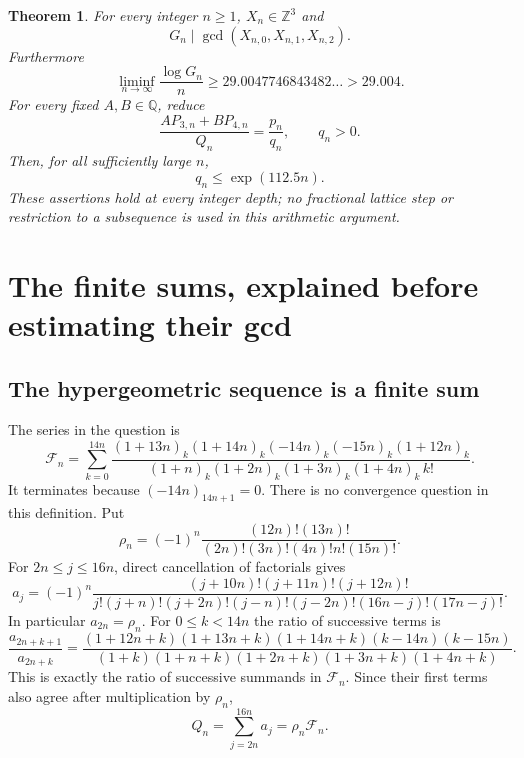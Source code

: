 \documentclass[11pt]{article}
\newcommand{\Z}{\mathbb Z}
\newcommand{\Q}{\mathbb Q}
\newtheorem{theorem}{Theorem}
\begin{document}
\begin{theorem}\label{arith-main}
For every integer $n\geq1$, $X_n\in\Z^3$ and
\[
 G_n\mid\gcd(X_{n,0},X_{n,1},X_{n,2}).
\]
Furthermore
\[
 \liminf_{n\to\infty}\frac{\log G_n}{n}
 \geq29.0047746843482\ldots>29.004.
\]
For every fixed $A,B\in\Q$, reduce
\[
 \frac{AP_{3,n}+BP_{4,n}}{Q_n}=\frac{p_n}{q_n},\qquad q_n>0.
\]
Then, for all sufficiently large $n$,
\[
 q_n\leq\exp(112.5n).
\]
These assertions hold at every integer depth; no fractional lattice step
or restriction to a subsequence is used in this arithmetic argument.
\end{theorem}

\section{The finite sums, explained before estimating their gcd}
\subsection{The hypergeometric sequence is a finite sum}
The series in the question is
\[
 \mathcal F_n=\sum_{k=0}^{14n}
 \frac{(1+13n)_k(1+14n)_k(-14n)_k(-15n)_k(1+12n)_k}
 {(1+n)_k(1+2n)_k(1+3n)_k(1+4n)_k\,k!}.
\]
It terminates because $(-14n)_{14n+1}=0$. There is no convergence
question in this definition. Put
\[
 \rho_n=(-1)^n\frac{(12n)!(13n)!}
 {(2n)!(3n)!(4n)!n!(15n)!}.
\]
For $2n\leq j\leq16n$, direct cancellation of factorials gives
\begin{equation}\label{arith-explicit-a}
 a_j=(-1)^n
 \frac{(j+10n)!(j+11n)!(j+12n)!}
 {j!(j+n)!(j+2n)!(j-n)!(j-2n)!(16n-j)!(17n-j)!}.
\end{equation}
In particular $a_{2n}=\rho_n$. For $0\leq k<14n$ the ratio of successive
terms is
\[
 \frac{a_{2n+k+1}}{a_{2n+k}}=
 \frac{(1+12n+k)(1+13n+k)(1+14n+k)(k-14n)(k-15n)}
 {(1+k)(1+n+k)(1+2n+k)(1+3n+k)(1+4n+k)}.
\]
This is exactly the ratio of successive summands in $\mathcal F_n$.
Since their first terms also agree after multiplication by $\rho_n$,
\begin{equation}\label{arith-hypergeom-q}
 Q_n=\sum_{j=2n}^{16n}a_j=\rho_n\mathcal F_n.
\end{equation}
\end{document}
